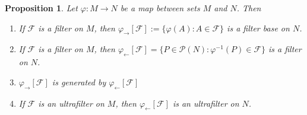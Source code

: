 \documentclass[12pt]{article}
\newtheorem{proposition}[theorem]{Proposition}
\begin{document}
\begin{proposition}\label{PrImageAndPreimageOfAFilter} Let $\varphi:M\to N$ be a
    map between sets $M$ and $N$. Then
    \begin{enumerate}[label = (\roman*)]
        \item If $\mathcal{F}$ is a filter on $M$, then
              $\varphi_{\rightarrow}[\mathcal{F}]:=\{\varphi(A):A\in\mathcal{F}\}$
              is a filter base on $N$.
        \item If $\mathcal{F}$ is a filter on $M$, then
              $\varphi_{\leftarrow}[\mathcal{F}]=
                  \{P\in\mathcal{P}(N):\varphi^{-1}(P)\in\mathcal{F}\}$ is a filter
              on $N$.
        \item $\varphi_{\rightarrow}[\mathcal{F}]$ is generated by
              $\varphi_{\leftarrow}[\mathcal{F}]$
        \item If $\mathcal{F}$ is an ultrafilter on $M$, then
              $\varphi_{\leftarrow}[\mathcal{F}]$ is an ultrafilter on $N$.
    \end{enumerate}
\end{proposition}
\end{document}
